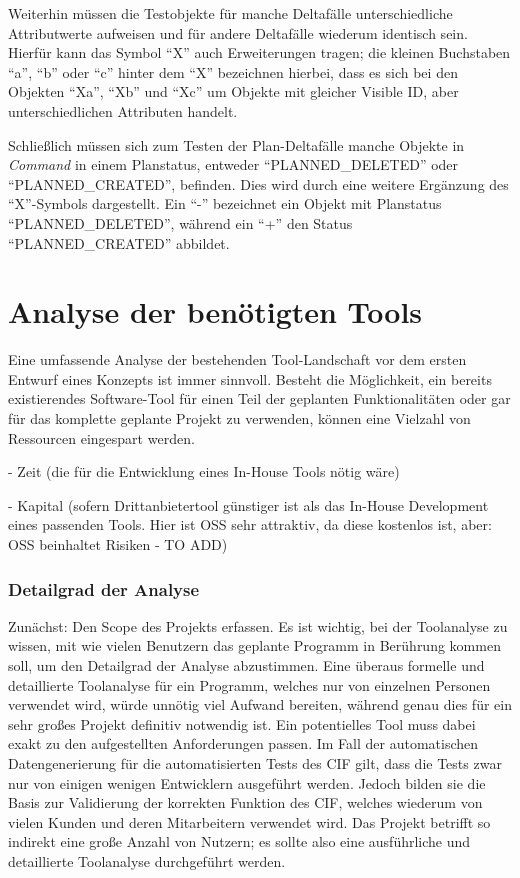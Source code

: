 Weiterhin müssen die Testobjekte für manche Deltafälle unterschiedliche Attributwerte aufweisen und für andere Deltafälle wiederum identisch sein. Hierfür kann das Symbol \enquote{X} auch Erweiterungen tragen; die kleinen Buchstaben \enquote{a}, \enquote{b} oder \enquote{c} hinter dem \enquote{X} bezeichnen hierbei, dass es sich bei den Objekten \enquote{Xa}, \enquote{Xb} und \enquote{Xc} um Objekte mit gleicher Visible ID, aber unterschiedlichen Attributen handelt.

Schließlich müssen sich zum Testen der Plan-Deltafälle manche Objekte in \textit{Command} in einem Planstatus, entweder \enquote{PLANNED\_DELETED} oder \enquote{PLANNED\_CREATED}, befinden. Dies wird durch eine weitere Ergänzung des \enquote{X}-Symbols dargestellt. Ein \enquote{-} bezeichnet ein Objekt mit Planstatus \enquote{PLANNED\_DELETED}, während ein \enquote{+} den Status \enquote{PLANNED\_CREATED} abbildet.

\section{Analyse der benötigten Tools}\label{sec:toolanalyse}
Eine umfassende Analyse der bestehenden Tool-Landschaft vor dem ersten Entwurf eines Konzepts ist immer sinnvoll. Besteht die Möglichkeit, ein bereits existierendes Software-Tool für einen Teil der geplanten Funktionalitäten oder gar für das komplette geplante Projekt zu verwenden, können eine Vielzahl von Ressourcen eingespart werden. 

- Zeit (die für die Entwicklung eines In-House Tools nötig wäre)

- Kapital (sofern Drittanbietertool günstiger ist als das In-House Development eines passenden Tools. Hier ist \ac{OSS} sehr attraktiv, da diese kostenlos ist, aber: \ac{OSS} beinhaltet Risiken - TO ADD)

\subsubsection*{Detailgrad der Analyse}\label{toolanalysedetail}
Zunächst: Den Scope des Projekts erfassen. Es ist wichtig, bei der Toolanalyse zu wissen, mit wie vielen Benutzern das geplante Programm in Berührung kommen soll, um den Detailgrad der Analyse abzustimmen. Eine überaus formelle und detaillierte Toolanalyse für ein Programm, welches nur von einzelnen Personen verwendet wird, würde unnötig viel Aufwand bereiten, während genau dies für ein sehr großes Projekt definitiv notwendig ist. Ein potentielles Tool muss dabei exakt zu den aufgestellten Anforderungen passen. \cite[S. 249]{fewster:1999} Im Fall der automatischen Datengenerierung für die automatisierten Tests des \ac{CIF} gilt, dass die Tests zwar nur von einigen wenigen Entwicklern ausgeführt werden. Jedoch bilden sie die Basis zur Validierung der korrekten Funktion des \ac{CIF}, welches wiederum von vielen Kunden und deren Mitarbeitern verwendet wird. Das Projekt betrifft so indirekt eine große Anzahl von Nutzern; es sollte also eine ausführliche und detaillierte Toolanalyse durchgeführt werden.

